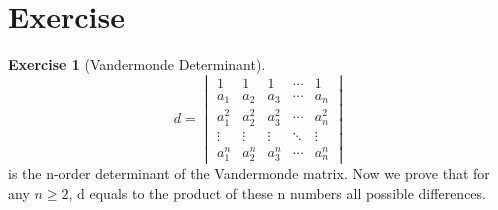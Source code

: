 \documentclass{article}
\theoremstyle{definition}
\newtheorem{exercise}{Exercise}[section]
\begin{document}
\section{Exercise}
\begin{exercise}[Vandermonde Determinant]
$$d=
\begin{vmatrix}
    1 & 1 & 1 & \cdots & 1\\
    a_{1} & a_{2} & a_{3} & \cdots & a_{n}\\
    a_{1}^{2} & a_{2}^{2} & a_{3}^{2} & \cdots & a_{n}^{2}\\
    \vdots & \vdots & \vdots & \ddots & \vdots\\
    a_{1}^{n} & a_{2}^{n} & a_{3}^{n} & \cdots & a_{n}^{n}
\end{vmatrix}$$
is the n-order determinant of the Vandermonde matrix.
Now we prove that for any $n \geq 2$, d equals to the product of 
these n numbers all possible differences.
\end{exercise}
\end{document}
